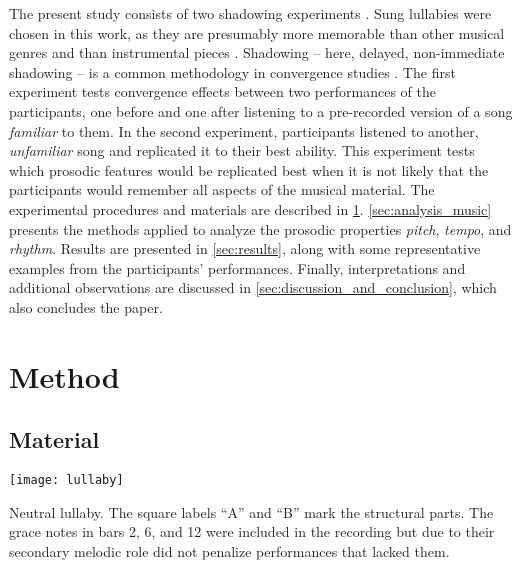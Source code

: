 
The present study consists of two shadowing experiments \citep[cf.][]{Goldinger1998echoes}.
Sung lullabies were chosen in this work, as they are presumably more memorable than other musical genres and than instrumental pieces \citep{Weiss2012something, Trehub1991music}.
Shadowing -- here, delayed, non-immediate shadowing -- is a common methodology in convergence studies \cite[e.g.,][]{Pardo2018comparison}.
The first experiment tests convergence effects between two performances of the participants, one before and one after listening to a pre-recorded version of a song \emph{familiar} to them.
In the second experiment, participants listened to another, \emph{unfamiliar} song and replicated it to their best ability.
This experiment tests which prosodic features would be replicated best when it is not likely that the participants would remember all aspects of the musical material.
The experimental procedures and materials are described in \cref{sec:method}.
\cref{sec:analysis_music} presents the methods applied to analyze the prosodic properties \emph{pitch}, \emph{tempo}, and \emph{rhythm}.
Results are presented in \cref{sec:results}, along with some representative examples from the participants' performances.
Finally, interpretations and additional observations are discussed in \cref{sec:discussion_and_conclusion}, which also concludes the paper.

\section{Method}
\label{sec:method}

\subsection{Material}
\label{subsec:material}

\begin{snippet}[t]
	\centering
	\texttt{[image: lullaby]}
	\caption{Neutral lullaby.
			 The square labels \enquote{A} and \enquote{B} mark the structural parts.
		 	 The grace notes in bars 2, 6, and 12 were included in the recording but due to their secondary melodic role did not penalize performances that lacked them.}
	\label{snippet:uni-lullaby}
\end{snippet}

